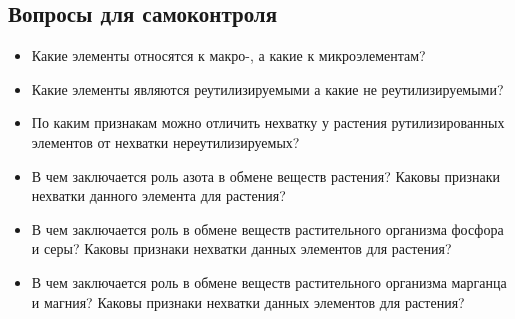 	\subsection*{Вопросы для самоконтроля}
	
	\begin{itemize}
		
		\item Какие элементы относятся к макро-, а какие к микроэлементам?
		\item Какие элементы являются реутилизируемыми а какие не реутилизируемыми? 
		\item По каким признакам можно отличить нехватку у растения рутилизированных элементов от нехватки нереутилизируемых?
		\item В чем заключается роль \hypertarget{nitrogen}{азота} в обмене веществ растения? Каковы признаки нехватки данного элемента для растения?
		\item В чем заключается роль в обмене веществ растительного организма \hypertarget{PS}{фосфора и серы}? Каковы признаки нехватки данных элементов для растения?
		\item В чем заключается роль в обмене веществ растительного организма \hypertarget{MnMg}{марганца и магния}? Каковы признаки нехватки данных элементов для растения?
	\end{itemize}
	




